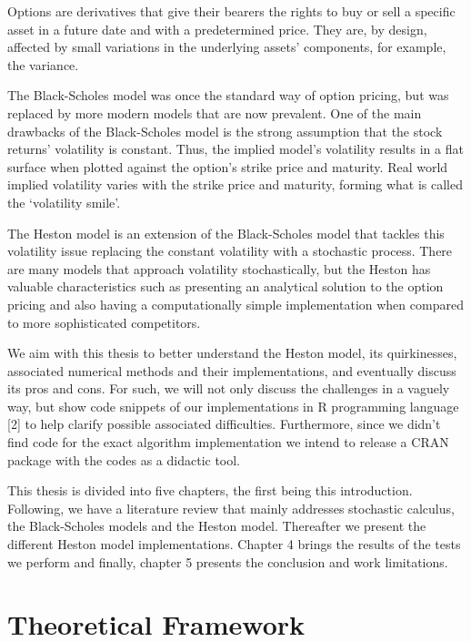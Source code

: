 \documentclass[12pt,twoside]{reedthesis}
\theoremstyle{definition}
\theoremstyle{definition}
\theoremstyle{remark}
\begin{document}
  Options are derivatives that give their bearers the rights to buy or
  sell a specific asset in a future date and with a predetermined price.
  They are, by design, affected by small variations in the underlying
  assets' components, for example, the variance.
  
  The Black-Scholes model was once the standard way of option pricing, but
  was replaced by more modern models that are now prevalent. One of the
  main drawbacks of the Black-Scholes model is the strong assumption that
  the stock returns' volatility is constant. Thus, the implied model's
  volatility results in a flat surface when plotted against the option's
  strike price and maturity. Real world implied volatility varies with the
  strike price and maturity, forming what is called the `volatility
  smile'.
  
  The Heston model is an extension of the Black-Scholes model that tackles
  this volatility issue replacing the constant volatility with a
  stochastic process. There are many models that approach volatility
  stochastically, but the Heston has valuable characteristics such as
  presenting an analytical solution to the option pricing and also having
  a computationally simple implementation when compared to more
  sophisticated competitors.
  
  We aim with this thesis to better understand the Heston model, its
  quirkinesses, associated numerical methods and their implementations,
  and eventually discuss its pros and cons. For such, we will not only
  discuss the challenges in a vaguely way, but show code snippets of our
  implementations in R programming language {[}2{]} to help clarify
  possible associated difficulties. Furthermore, since we didn't find code
  for the exact algorithm implementation we intend to release a CRAN
  package with the codes as a didactic tool.
  
  This thesis is divided into five chapters, the first being this
  introduction. Following, we have a literature review that mainly
  addresses stochastic calculus, the Black-Scholes models and the Heston
  model. Thereafter we present the different Heston model implementations.
  Chapter 4 brings the results of the tests we perform and finally,
  chapter 5 presents the conclusion and work limitations.
  
  \chapter{Theoretical Framework}\label{lt-review}
  
\end{document}
